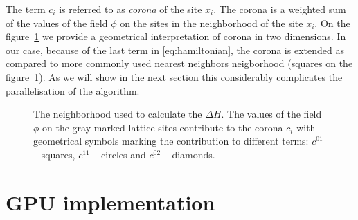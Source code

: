 \documentclass[a4paper]{llncs}
\def\bksize{8}
\def\bkcount{4}
\def\lcsize{5}
\begin{document}
The term $c_i$ is referred to as {\em corona} of the site $x_i$.  The
corona is a weighted sum of the values of the field $\phi$ on the
sites in the neighborhood of the site $x_i$. On the
figure~\ref{fig:nn} we provide a geometrical interpretation of corona
in two dimensions.  In our case, because of the last term in
\eqref{eq:hamiltonian}, the corona is extended as compared to more
commonly used nearest neighbors neigborhood (squares on the figure~\ref{fig:nn}). As we will show in
the next section this considerably complicates the parallelisation of
the algorithm. 
\begin{figure}
\begin{center}
\end{center}
\caption{\label{fig:nn}The neighborhood used to calculate the $\Delta
  H$.  The values of the field $\phi$ on the gray marked lattice sites
  contribute to the corona $c_i$ with geometrical symbols marking the
  contribution to different terms: $c^{01}$ -- squares, $c^{11}$ --
  circles and $c^{02}$ -- diamonds.}
\end{figure}


\section{GPU implementation}
\end{document}
